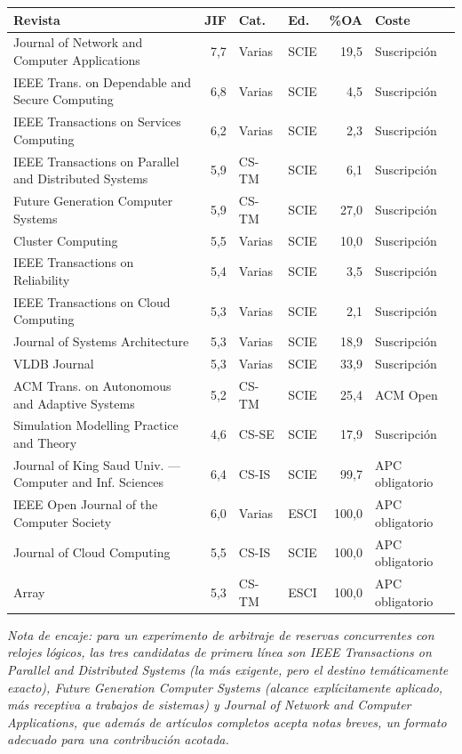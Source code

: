 \documentclass[11pt,a4paper]{article}
\newcommand{\jcrnote}[1]{{\footnotesize\itshape #1}}
\begin{document}
\begin{center}
	\footnotesize
	\begin{longtable}{@{}p{6.2cm}rp{1.2cm}p{1.3cm}rp{3.4cm}@{}}
		\toprule
		\textbf{Revista} & \textbf{JIF} & \textbf{Cat.} & \textbf{Ed.} & \textbf{\%OA} & \textbf{Coste} \\
		\midrule
		\endhead
		Journal of Network and Computer Applications & 7,7 & Varias & SCIE & 19,5 & Suscripción \\
		IEEE Trans. on Dependable and Secure Computing & 6,8 & Varias & SCIE & 4,5 & Suscripción \\
		IEEE Transactions on Services Computing & 6,2 & Varias & SCIE & 2,3 & Suscripción \\
		IEEE Transactions on Parallel and Distributed Systems & 5,9 & CS-TM & SCIE & 6,1 & Suscripción \\
		Future Generation Computer Systems & 5,9 & CS-TM & SCIE & 27,0 & Suscripción \\
		Cluster Computing & 5,5 & Varias & SCIE & 10,0 & Suscripción \\
		IEEE Transactions on Reliability & 5,4 & Varias & SCIE & 3,5 & Suscripción \\
		IEEE Transactions on Cloud Computing & 5,3 & Varias & SCIE & 2,1 & Suscripción \\
		Journal of Systems Architecture & 5,3 & Varias & SCIE & 18,9 & Suscripción \\
		VLDB Journal & 5,3 & Varias & SCIE & 33,9 & Suscripción \\
		ACM Trans. on Autonomous and Adaptive Systems & 5,2 & CS-TM & SCIE & 25,4 & ACM Open \\
		Simulation Modelling Practice and Theory & 4,6 & CS-SE & SCIE & 17,9 & Suscripción \\
		\addlinespace
		Journal of King Saud Univ. --- Computer and Inf. Sciences & 6,4 & CS-IS & SCIE & 99,7 & APC obligatorio \\
		IEEE Open Journal of the Computer Society & 6,0 & Varias & ESCI & 100,0 & APC obligatorio \\
		Journal of Cloud Computing & 5,5 & CS-IS & SCIE & 100,0 & APC obligatorio \\
		Array & 5,3 & CS-TM & ESCI & 100,0 & APC obligatorio \\
		\bottomrule
	\end{longtable}
\end{center}

\jcrnote{Nota de encaje: para un experimento de arbitraje de reservas concurrentes con relojes lógicos, las tres candidatas de primera línea son \emph{IEEE Transactions on Parallel and Distributed Systems} (la más exigente, pero el destino temáticamente exacto), \emph{Future Generation Computer Systems} (alcance explícitamente aplicado, más receptiva a trabajos de sistemas) y \emph{Journal of Network and Computer Applications}, que además de artículos completos acepta notas breves, un formato adecuado para una contribución acotada.}
\end{document}

